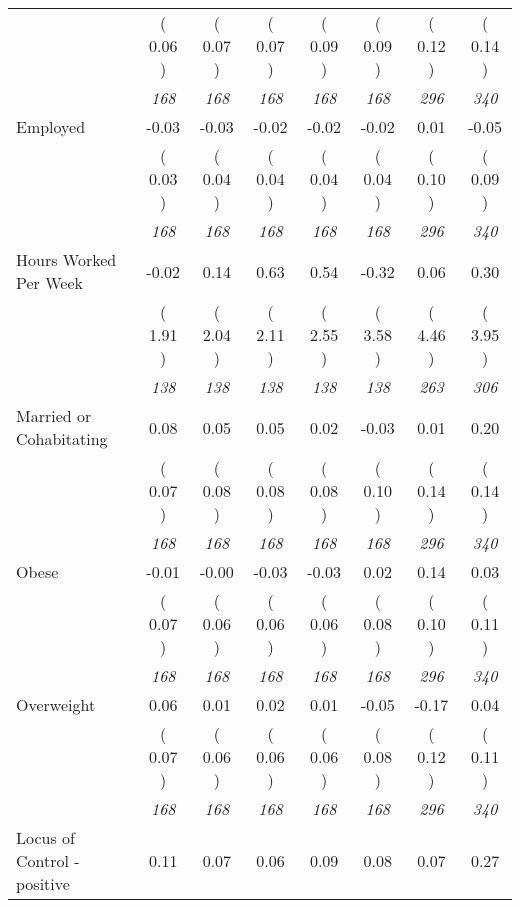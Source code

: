 \begin{tabular}{l c c c c c c c}
& (     0.06 ) & (     0.07 ) & (     0.07 ) & (     0.09 ) & (     0.09 ) & (     0.12 ) & (     0.14 ) \\
& \textit{ 168 } & \textit{ 168 } & \textit{ 168 } & \textit{ 168 } & \textit{ 168 } & \textit{ 296 } & \textit{ 340 } \\
Employed &     -0.03 &     -0.03 &     -0.02 &     -0.02 &     -0.02 &      0.01 &     -0.05 \\
& (     0.03 ) & (     0.04 ) & (     0.04 ) & (     0.04 ) & (     0.04 ) & (     0.10 ) & (     0.09 ) \\
& \textit{ 168 } & \textit{ 168 } & \textit{ 168 } & \textit{ 168 } & \textit{ 168 } & \textit{ 296 } & \textit{ 340 } \\
Hours Worked Per Week &     -0.02 &      0.14 &      0.63 &      0.54 &     -0.32 &      0.06 &      0.30 \\
& (     1.91 ) & (     2.04 ) & (     2.11 ) & (     2.55 ) & (     3.58 ) & (     4.46 ) & (     3.95 ) \\
& \textit{ 138 } & \textit{ 138 } & \textit{ 138 } & \textit{ 138 } & \textit{ 138 } & \textit{ 263 } & \textit{ 306 } \\
Married or Cohabitating &      0.08 &      0.05 &      0.05 &      0.02 &     -0.03 &      0.01 &      0.20 \\
& (     0.07 ) & (     0.08 ) & (     0.08 ) & (     0.08 ) & (     0.10 ) & (     0.14 ) & (     0.14 ) \\
& \textit{ 168 } & \textit{ 168 } & \textit{ 168 } & \textit{ 168 } & \textit{ 168 } & \textit{ 296 } & \textit{ 340 } \\
Obese &     -0.01 &     -0.00 &     -0.03 &     -0.03 &      0.02 &      0.14 &      0.03 \\
& (     0.07 ) & (     0.06 ) & (     0.06 ) & (     0.06 ) & (     0.08 ) & (     0.10 ) & (     0.11 ) \\
& \textit{ 168 } & \textit{ 168 } & \textit{ 168 } & \textit{ 168 } & \textit{ 168 } & \textit{ 296 } & \textit{ 340 } \\
Overweight &      0.06 &      0.01 &      0.02 &      0.01 &     -0.05 &     -0.17 &      0.04 \\
& (     0.07 ) & (     0.06 ) & (     0.06 ) & (     0.06 ) & (     0.08 ) & (     0.12 ) & (     0.11 ) \\
& \textit{ 168 } & \textit{ 168 } & \textit{ 168 } & \textit{ 168 } & \textit{ 168 } & \textit{ 296 } & \textit{ 340 } \\
Locus of Control - positive &      0.11 &      0.07 &      0.06 &      0.09 &      0.08 &      0.07 &      0.27 \\

\end{tabular}
